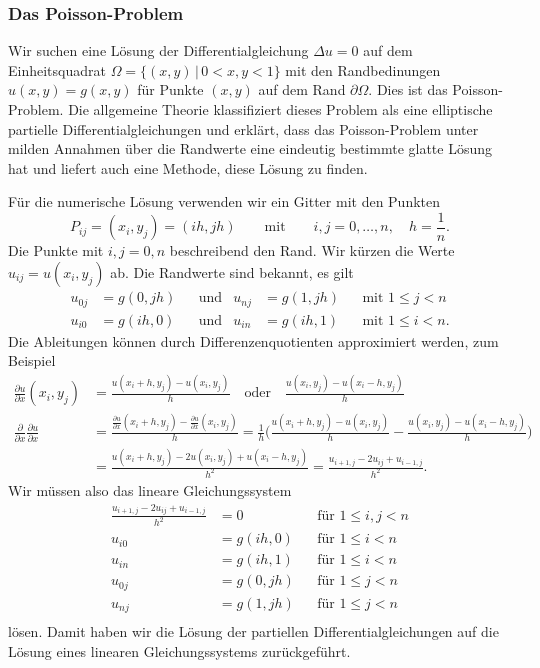 \subsubsection{Das Poisson-Problem}
Wir suchen eine Lösung der Differentialgleichung
$\Delta u = 0$ auf dem Einheitsquadrat $\Omega=\{(x,y)\,|\, 0<x,y < 1\}$
mit den Randbedinungen $u(x,y)=g(x,y)$ für Punkte $(x,y)$ auf dem
Rand $\partial\Omega$.
Dies ist das Poisson-Problem.
Die allgemeine Theorie \cite{skript:pde} klassifiziert dieses Problem
als eine elliptische partielle Differentialgleichungen und erklärt,
dass das Poisson-Problem unter milden Annahmen über die Randwerte
eine eindeutig bestimmte glatte Lösung hat und liefert auch eine Methode,
diese Lösung zu finden.

Für die numerische Lösung verwenden wir ein Gitter mit den Punkten
\[
P_{ij}
=
(x_i,y_j)
=
(ih, jh)
\qquad\text{mit}\qquad
i,j=0,\dots,n,\quad
h = \frac1n.
\]
Die Punkte mit $i,j=0,n$ beschreibend den Rand.
Wir kürzen die Werte $u_{ij}=u(x_i,y_j)$ ab.
Die Randwerte sind bekannt, es gilt
\begin{align*}
u_{0j} &= g(0,jh)
&&\text{und}&
u_{nj} &= g(1,jh)
&&\text{mit $1\le j < n$}
\\
u_{i0} &= g(ih,0)
&&\text{und}&
u_{in} &= g(ih,1)
&&\text{mit $1\le i < n$.}
\end{align*}
Die Ableitungen können durch Differenzenquotienten approximiert werden,
zum Beispiel
\begin{align*}
\frac{\partial u}{\partial x}(x_i,y_j)
&=
\frac{u(x_i+h,y_j)-u(x_i,y_j)}{h}
\quad\text{oder}\quad
\frac{u(x_i,y_j)-u(x_i-h,y_j)}{h}
\\
\frac{\partial}{\partial x}
\frac{\partial u}{\partial x}
&=
\frac{\displaystyle
\frac{\partial u}{\partial x}(x_i+h,y_j)
-
\frac{\partial u}{\partial x}(x_i,y_j)
}{h}
=
\frac1h 
\biggl(
\frac{u(x_i+h,y_j) - u(x_i,y_j)}{h}
-
\frac{u(x_i,y_j) - u(x_i-h,y_j)}{h}
\biggr)
\\
&=
\frac{ u(x_i+h,y_j)-2u(x_i,y_j)+u(x_i-h,y_j) }{h^2}
=
\frac{u_{i+1,j}-2u_{ij}+u_{i-1,j}}{h^2}.
\end{align*}
Wir müssen also das lineare Gleichungssystem
\begin{equation}
\begin{aligned}
\frac{u_{i+1,j}-2u_{ij}+u_{i-1,j}}{h^2} &=0
&&\text{für $1 \le i,j< n$}
\\
u_{i0} &= g(ih, 0)&&\text{für $1\le i<n$}\\
u_{in} &= g(ih, 1)&&\text{für $1\le i<n$}\\
u_{0j} &= g(0, jh)&&\text{für $1\le j<n$}\\
u_{nj} &= g(1, jh)&&\text{für $1\le j<n$}\\
\end{aligned}
\end{equation}
lösen.
Damit haben wir die Lösung der partiellen Differentialgleichungen auf
die Lösung eines linearen Gleichungssystems zurückgeführt.

